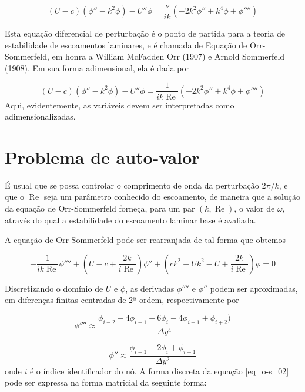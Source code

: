 \documentclass[a4paper,portuguese,10pt]{article}
\renewcommand{\Re}{\operatorname{Re}}
\begin{document}
\begin{equation}
  (U-c)(\phi''-k^2\phi)-U''\phi=\frac{\nu}{ik}(-2k^2\phi''+k^4\phi+\phi'''')
\end{equation}

Esta equação diferencial de perturbação é o ponto de partida para a teoria de estabilidade de escoamentos laminares, e é chamada de Equação de Orr-Sommerfeld, em honra a William McFadden Orr (1907) e Arnold Sommerfeld (1908). Em sua forma adimensional, ela é dada por

\begin{equation}
  (U-c)(\phi''-k^2\phi)-U''\phi=\frac{1}{ik\Re}(-2k^2\phi''+k^4\phi+\phi'''')
\end{equation}
Aqui, evidentemente, as variáveis devem ser interpretadas como adimensionalizadas.

\section{Problema de auto-valor}

É usual que se possa controlar o comprimento de onda da perturbação $2\pi/k$, e que o $\Re$ seja um parâmetro conhecido do escoamento, de maneira que a solução da equação de Orr-Sommerfeld forneça, para um par $(k,\Re)$, o valor de $\omega$, através do qual a estabilidade do escoamento laminar base é avaliada.

A equação de Orr-Sommerfeld pode ser rearranjada de tal forma que obtemos

\begin{equation}
  -\frac{1}{ik\Re}\phi''''+\left(U-c+\frac{2k}{i\Re}\right)\phi''+\left(ck^2-Uk^2-U+\frac{2k}{i\Re}\right)\phi=0
  \label{eq_o-s_02}
\end{equation}

Discretizando o domínio de $U$  e $\phi$, as derivadas $\phi''''$ e $\phi''$ podem ser aproximadas, em diferenças finitas centradas de 2ª ordem, respectivamente por

\begin{equation}
  \phi'''' \approx \frac{\phi_{i-2}-4\phi_{i-1}+6\phi_i-4\phi_{i+1}+\phi_{i+2})}{\Delta y^4}
\end{equation}

\begin{equation}
  \phi'' \approx \frac{\phi_{i-1}-2\phi_i+\phi_{i+1}}{\Delta y^2}
\end{equation}
onde $i$ é o índice identificador do nó. A forma discreta da equação \ref{eq_o-s_02} pode ser expressa na forma matricial da seguinte forma:
\end{document}
